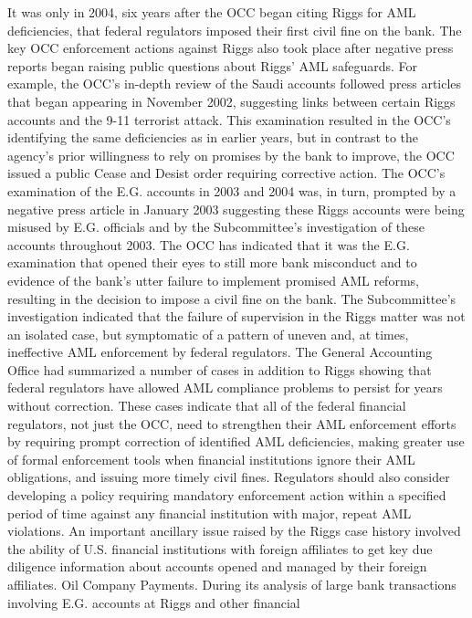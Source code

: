 It was only in 2004, six years after the OCC began citing Riggs for AML deficiencies, that
federal regulators imposed their first civil fine on the bank.
The key OCC enforcement actions against Riggs also took place after negative press reports began
raising public questions about Riggs’ AML safeguards. For example, the OCC’s in-depth review of the
Saudi accounts followed press articles that began appearing in November 2002, suggesting links
between certain Riggs accounts and the 9-11 terrorist attack. This examination resulted in the OCC’s
identifying the same deficiencies as in earlier years, but in contrast to the agency’s prior willingness
to rely on promises by the bank to improve, the OCC issued a public Cease and Desist order requiring
corrective action. The OCC’s examination of the E.G. accounts in 2003 and 2004 was, in turn,
prompted by a negative press article in January 2003 suggesting these Riggs accounts were being
misused by E.G. officials and by the Subcommittee’s investigation of these accounts throughout
2003. The OCC has indicated that it was the E.G. examination that opened their eyes to still more
bank misconduct and to evidence of the bank’s utter failure to implement promised AML reforms,
resulting in the decision to impose a civil fine on the bank.
The Subcommittee’s investigation indicated that the failure of supervision in the Riggs matter was
not an isolated case, but symptomatic of a pattern of uneven and, at times, ineffective AML
enforcement by federal regulators. The General Accounting Office had summarized a number of
cases in addition to Riggs showing that federal regulators have allowed AML compliance problems to
persist for years without correction. These cases indicate that all of the federal financial regulators,
not just the OCC, need to strengthen their AML enforcement efforts by requiring prompt correction
of identified AML deficiencies, making greater use of formal enforcement tools when financial
institutions ignore their AML obligations, and issuing more timely civil fines. Regulators should also
consider developing a policy requiring mandatory enforcement action within a specified period of
time against any financial institution with major, repeat AML violations.
An important ancillary issue raised by the Riggs case history involved the ability of U.S. financial
institutions with foreign affiliates to get key due diligence information about accounts opened and
managed by their foreign affiliates.
Oil Company Payments.
During its analysis of large bank transactions involving E.G. accounts at Riggs and other financial
